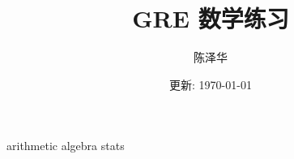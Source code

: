 \documentclass{report}
\title{GRE 数学练习}
\author{陈泽华}
\date{更新: \today}
\begin{document}
  \maketitle
  \tableofcontents

  {arithmetic}
  {algebra}
  {stats}
\end{document}
